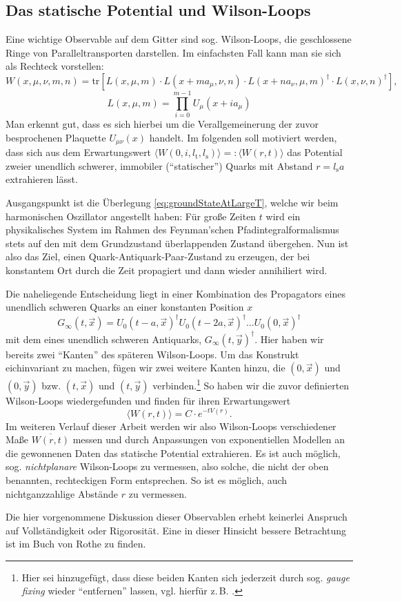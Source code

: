\subsection{Das statische Potential und Wilson-Loops} \label{sec:thWilsonLoops}
Eine wichtige Observable auf dem Gitter sind sog. Wilson-Loops, die geschlossene
Ringe von Paralleltransporten darstellen. Im einfachsten Fall kann man sie sich
als Rechteck vorstellen:
\[
    W(x, \mu, \nu, m, n) = \text{tr} \left[ L(x, \mu, m)
    \cdot L(x + m a_\mu, \nu, n) \cdot L(x + n a_\nu, \mu, m)^\dag
    \cdot L(x, \nu, n)^\dag \right],
\]
\[
    L(x, \mu, m) = \prod_{i=0}^{m-1} U_\mu(x + i a_\mu)
\]
Man erkennt gut, dass es sich hierbei um die Verallgemeinerung der zuvor besprochenen
Plaquette $U_{\mu \nu}(x)$ handelt.
Im folgenden soll motiviert werden, dass sich aus dem Erwartungswert
$\langle W(0, i, l_\text{t}, l_\text{s}) \rangle =: \langle W(r,t)\rangle$
das Potential zweier unendlich schwerer, immobiler (\enquote{statischer}) Quarks mit
Abstand $r = l_\text{s} a$ extrahieren lässt.

Ausgangspunkt ist die Überlegung \eqref{eq:groundStateAtLargeT}, welche wir beim
harmonischen Oszillator angestellt haben: Für große Zeiten $t$ wird ein
physikalisches System im Rahmen des Feynman'schen Pfadintegralformalismus stets
auf den mit dem Grundzustand überlappenden Zustand übergehen. Nun ist also das Ziel,
einen Quark-Antiquark-Paar-Zustand zu erzeugen, der bei konstantem Ort durch die
Zeit propagiert und dann wieder annihiliert wird.

Die naheliegende Entscheidung liegt in einer Kombination des Propagators eines
unendlich schweren Quarks an einer konstanten Position $x$ \cite{latticeQCDforNovices}
\[
    G_\infty(t, \vec{x}) = U_0(t-a, \vec{x})^\dag U_0(t-2a, \vec{x})^\dag
    \dots U_0(0, \vec{x})^\dag
\]
mit dem eines unendlich schweren Antiquarks, $G_\infty(t, \vec{y})^\dag$. Hier haben
wir bereits zwei \enquote{Kanten} des späteren Wilson-Loops. Um das Konstrukt
eichinvariant zu machen, fügen wir zwei weitere Kanten hinzu, die $(0,\vec{x})$
und $(0,\vec{y})$ bzw. $(t,\vec{x})$ und $(t,\vec{y})$
verbinden.\footnote{Hier sei hinzugefügt, dass diese beiden Kanten sich jederzeit
durch sog. \emph{gauge fixing} wieder \enquote{entfernen} lassen, vgl. hierfür z.\,B. 
\cite{gattringerLang}.} So haben wir die zuvor definierten Wilson-Loops wiedergefunden
und finden für ihren Erwartungswert \cite{loopsStaticPotRothe}
\begin{equation} \label{eq:wilsonStaticPot}
    \langle W(r,t) \rangle = C \cdot e^{-t V(r)}.
\end{equation}
Im weiteren Verlauf dieser Arbeit werden wir also Wilson-Loops verschiedener Maße
$\overline{W(r,t)}$ messen und durch Anpassungen von exponentiellen Modellen an die
gewonnenen Daten das statische Potential extrahieren. Es ist auch möglich, sog.
\emph{nichtplanare} Wilson-Loops zu vermessen, also solche, die nicht der oben
benannten, rechteckigen Form entsprechen. So ist es möglich, auch nichtganzzahlige
Abstände $r$ zu vermessen.

Die hier vorgenommene Diskussion dieser Observablen erhebt keinerlei Anspruch auf
Vollständigkeit oder Rigorosität. Eine in dieser Hinsicht bessere Betrachtung ist
im Buch von Rothe \cite{loopsStaticPotRothe} zu finden. 
